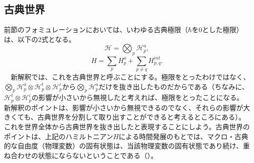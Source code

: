 \subsection{古典世界}
前節のフォミュレーションにおいては、いわゆる古典極限（$\hbar$を$0$とした極限）は、以下の2式となる。
\begin{equation}
    \mathcal{H} = \bigotimes_p \mathcal{H}_p^a,
\end{equation}
\begin{equation}
H=\sum_pH_p^a+ \sum_{p \neq q} H^{int}_{p,q}.
\end{equation}
　新解釈では、これを古典世界と呼ぶことにする。極限をとったわけではなく、$\bigotimes_p \mathcal{H}_p^a \otimes  \mathcal{H}_p^t \otimes  \mathcal{H}_p^i$から$\bigotimes_p \mathcal{H}_p^a$だけを抜き出したものだからである（ちなみに、$\mathcal{H}_p^t \otimes  \mathcal{H}_p^i$の影響が小さいから無視したと考えれば、極限をとったことになる。新解釈のポイントは、影響が小さいから無視できるのでなく、それらの影響が大きくても、古典世界を分割して取り出すことができると考えるところにある）。これを世界全体から古典世界を抜き出したと表現することにしよう。古典世界のポイントは、上記のハミルトニアン$H$による時間発展のもとでは、マクロ・古典的な自由度（物理変数）の固有状態は、当該物理変数の固有状態であり続け、重ね合わせの状態にならないということである（）。